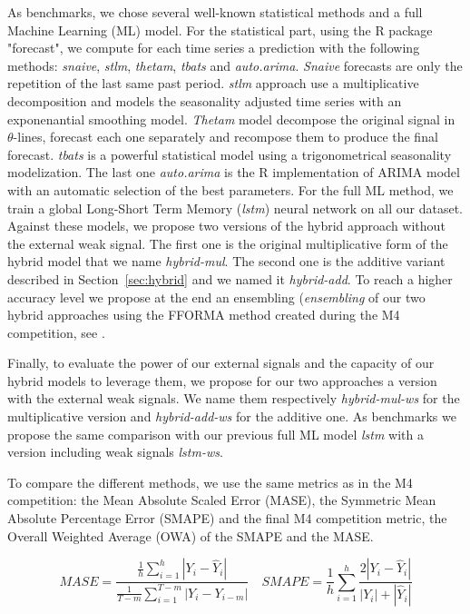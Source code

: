 \documentclass[letterpaper]{article} %
\begin{document}
As benchmarks, we chose several well-known statistical methods and a full Machine Learning (ML) model. For the statistical part, using the R package "forecast", we compute for each time series a prediction with the following methods: \textit{snaive}, \textit{stlm}, \textit{thetam}, \textit{tbats} and \textit{auto.arima}. \textit{Snaive} forecasts are only the repetition of the last same past period. \textit{stlm} approach use a multiplicative decomposition and models the seasonality adjusted time series with an exponenantial smoothing model. \textit{Thetam} model decompose the original signal in $\theta$-lines, forecast each one separately and recompose them to produce the final forecast. \textit{tbats} is a powerful statistical model using a trigonometrical seasonality modelization. The last one \textit{auto.arima} is the R implementation of ARIMA model with an automatic selection of the best parameters. For the full ML method, we train a global Long-Short Term Memory (\textit{lstm}) neural network on all our dataset. Against these models, we propose two versions of the hybrid approach without the external weak signal. The first one is the original multiplicative form of the hybrid model that we name \textit{hybrid-mul}. The second one is the additive variant described in Section~\ref{sec:hybrid} and we named it \textit{hybrid-add}. To reach a higher accuracy level we propose at the end an ensembling (\textit{ensembling} of our two hybrid approaches using the FFORMA method created during the M4 competition, see \citep{fforma} . 

Finally, to evaluate the power of our external signals and the capacity of our hybrid models to leverage them, we propose for our two approaches a version with the external weak signals. We name them respectively \textit{hybrid-mul-ws} for the multiplicative version and \textit{hybrid-add-ws} for the additive one. As benchmarks we propose the same comparison with our previous full ML model \textit{lstm} with a version including weak signals \textit{lstm-ws}.


To compare the different methods, we use the same metrics as in the M4 competition: the Mean Absolute Scaled Error (MASE), the Symmetric Mean Absolute Percentage Error (SMAPE) and the final M4 competition metric, the Overall Weighted Average (OWA) of the SMAPE and the MASE. 


$$
MASE = \frac{\frac{1}{h}\sum_{i=1}^h |Y_i - \hat{Y}_i| }{\frac{1}{T-m}\sum_{i=1}^{T-m} |Y_i - Y_{i-m}|} \quad
SMAPE = \frac{1}{h} \sum_{i=1}^h \frac{2|Y_i - \hat{Y}_i|}{|Y_i| + |\hat{Y}_i|}
$$
\end{document}
